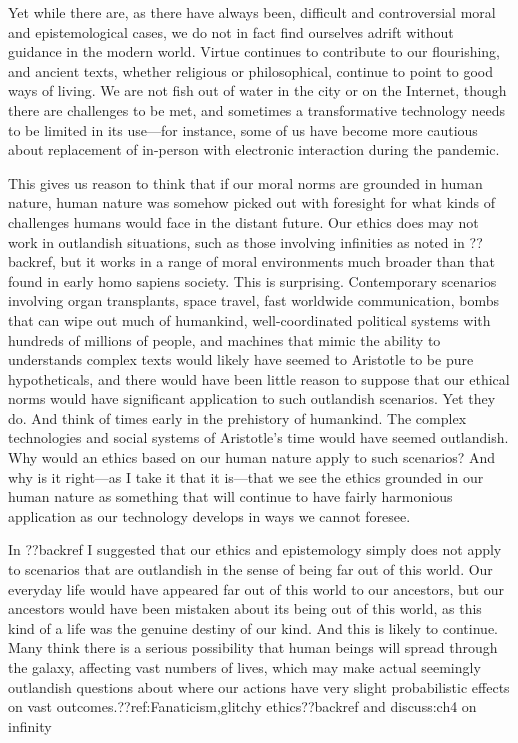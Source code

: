 Yet while there are, as there have always been, difficult and controversial moral and epistemological cases, 
we do not in fact find ourselves adrift without guidance in the modern world. Virtue continues to contribute 
to our flourishing, and ancient texts, whether religious or philosophical, continue to point to good ways of 
living. We are not fish out of water in the city or on the Internet, though there are challenges to be met,
and sometimes a transformative technology needs to be limited in its use---for instance, some of us have 
become more cautious about replacement of in-person with electronic interaction during the pandemic.

This gives us reason to think that if our moral norms are grounded in human nature, human nature was somehow
picked out with foresight for what kinds of challenges humans would face in the distant future. Our ethics
does may not work in outlandish situations, such as those involving infinities as noted in ??backref, but it works in a
range of moral environments much broader than that found in early homo sapiens society. This is surprising. 
Contemporary scenarios involving organ transplants, space travel, fast worldwide communication, bombs that can wipe out
much of humankind, well-coordinated political systems with hundreds of millions of people, and machines that mimic 
the ability to understands complex texts 
would likely have seemed to Aristotle to be pure hypotheticals, and there would have been little reason to suppose
that our ethical norms would have significant application to such outlandish scenarios. Yet they do. And think of
times early in the prehistory of humankind. The complex technologies and social systems
of Aristotle's time would have seemed outlandish. Why would an ethics based on our human nature apply to such
scenarios? And why is it right---as I take it that it is---that we see the ethics grounded in our human nature 
as something that will continue to have fairly harmonious application as our technology develops in ways we cannot 
foresee. 

In ??backref I suggested that our ethics and epistemology simply does not apply to scenarios that are outlandish
in the sense of being far out of this world.  Our everyday life would have appeared far out of this world to our 
ancestors, but our ancestors would have been mistaken about its being out of this world, as this kind of a life 
was the genuine destiny of our kind. And this is likely to continue. Many think there is a serious possibility 
that human beings will spread through the galaxy, affecting vast numbers of lives, which may make actual seemingly 
outlandish questions about where our actions have very slight probabilistic effects on vast outcomes.??ref:Fanaticism,glitchy ethics??backref and discuss:ch4 on infinity

